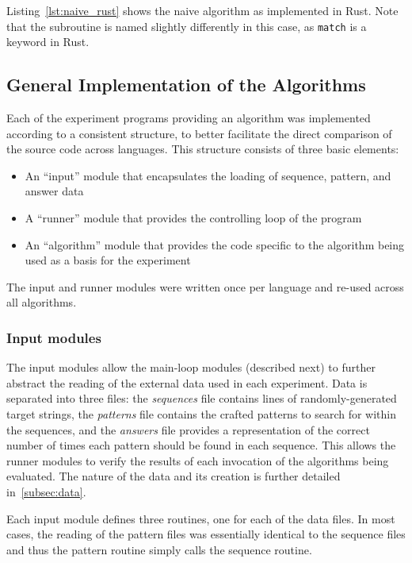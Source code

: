 Listing~\ref{lst:naive_rust} shows the naive algorithm as implemented in Rust. Note that the subroutine is named slightly differently in this case, as \texttt{match} is a keyword in Rust.



\subsection{General Implementation of the Algorithms}

Each of the experiment programs providing an algorithm was implemented according to a consistent structure, to better facilitate the direct comparison of the source code across languages. This structure consists of three basic elements:

\begin{itemize}
\item An ``input'' module that encapsulates the loading of sequence, pattern, and answer data
\item A ``runner'' module that provides the controlling loop of the program
\item An ``algorithm'' module that provides the code specific to the algorithm being used as a basis for the experiment
\end{itemize}

The input and runner modules were written once per language and re-used across all algorithms.

\subsubsection{Input modules}

The input modules allow the main-loop modules (described next) to further abstract the reading of the external data used in each experiment. Data is separated into three files: the \textit{sequences} file contains lines of randomly-generated target strings, the \textit{patterns} file contains the crafted patterns to search for within the sequences, and the \textit{answers} file provides a representation of the correct number of times each pattern should be found in each sequence. This allows the runner modules to verify the results of each invocation of the algorithms being evaluated. The nature of the data and its creation is further detailed in~\ref{subsec:data}.

Each input module defines three routines, one for each of the data files. In most cases, the reading of the pattern files was essentially identical to the sequence files and thus the pattern routine simply calls the sequence routine.

